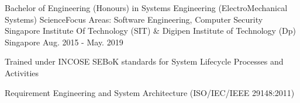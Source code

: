 

\begin{cventries}

  \cventry
    {Bachelor of Engineering (Honours) in Systems Engineering (ElectroMechanical Systems) Science\linebreak Focus Areas: Software Engineering, Computer Security} %
    {Singapore Institute Of Technology (SIT) \& Digipen Institute of Technology (Dp)} %
    {Singapore} %
    {Aug. 2015 - May. 2019} %
    {
      \begin{cvitems} %
        \item {Trained under INCOSE SEBoK standards for System Lifecycle Processes and Activities }
        \item {Requirement Engineering and System Architecture (ISO/IEC/IEEE 29148:2011)}
      \end{cvitems}
    }

\end{cventries}
